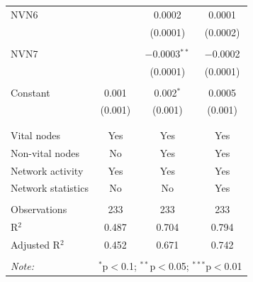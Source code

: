 \begin{table}[!htbp]
\begin{tabular}{@{\extracolsep{5pt}}lccc}
 NVN6 &  & 0.0002 & 0.0001 \\ 
  &  & (0.0001) & (0.0002) \\ 
  & & & \\ 
 NVN7 &  & $-$0.0003$^{**}$ & $-$0.0002 \\ 
  &  & (0.0001) & (0.0001) \\ 
  & & & \\ 
 Constant & 0.001 & 0.002$^{*}$ & 0.0005 \\ 
  & (0.001) & (0.001) & (0.001) \\ 
  & & & \\ 
\hline \\[-1.8ex] 
Vital nodes & Yes & Yes & Yes \\ 
Non-vital nodes & No & Yes & Yes \\ 
Network activity & Yes & Yes & Yes \\ 
Network statistics & No & No & Yes \\ 
\hline &  &  &  \\ 
Observations & 233 & 233 & 233 \\ 
R$^{2}$ & 0.487 & 0.704 & 0.794 \\ 
Adjusted R$^{2}$ & 0.452 & 0.671 & 0.742 \\ 
\hline 
\hline \\[-1.8ex] 
\textit{Note:}  & \multicolumn{3}{r}{$^{*}$p$<$0.1; $^{**}$p$<$0.05; $^{***}$p$<$0.01} \\ 
\end{tabular} 
\end{table} 
